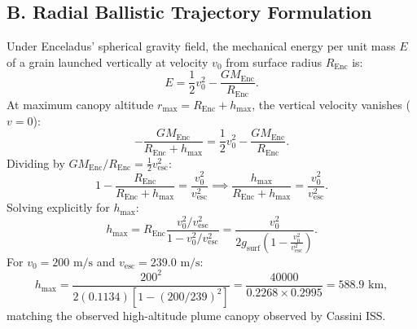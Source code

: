 \documentclass[11pt,a4paper]{article}
\begin{document}
\subsection*{B. Radial Ballistic Trajectory Formulation}
Under Enceladus' spherical gravity field, the mechanical energy per unit mass $E$ of a grain launched vertically at velocity $v_0$ from surface radius $R_{\mathrm{Enc}}$ is:
\begin{equation}
E = \frac{1}{2} v_0^2 - \frac{G M_{\mathrm{Enc}}}{R_{\mathrm{Enc}}}.
\end{equation}
At maximum canopy altitude $r_{\mathrm{max}} = R_{\mathrm{Enc}} + h_{\mathrm{max}}$, the vertical velocity vanishes ($v = 0$):
\begin{equation}
-\frac{G M_{\mathrm{Enc}}}{R_{\mathrm{Enc}} + h_{\mathrm{max}}} = \frac{1}{2} v_0^2 - \frac{G M_{\mathrm{Enc}}}{R_{\mathrm{Enc}}}.
\end{equation}
Dividing by $G M_{\mathrm{Enc}} / R_{\mathrm{Enc}} = \frac{1}{2} v_{\mathrm{esc}}^2$:
\begin{equation}
1 - \frac{R_{\mathrm{Enc}}}{R_{\mathrm{Enc}} + h_{\mathrm{max}}} = \frac{v_0^2}{v_{\mathrm{esc}}^2} \implies \frac{h_{\mathrm{max}}}{R_{\mathrm{Enc}} + h_{\mathrm{max}}} = \frac{v_0^2}{v_{\mathrm{esc}}^2}.
\end{equation}
Solving explicitly for $h_{\mathrm{max}}$:
\begin{equation}
h_{\mathrm{max}} = R_{\mathrm{Enc}} \frac{v_0^2 / v_{\mathrm{esc}}^2}{1 - v_0^2 / v_{\mathrm{esc}}^2} = \frac{v_0^2}{2 g_{\mathrm{surf}} \left( 1 - \frac{v_0^2}{v_{\mathrm{esc}}^2} \right)}.
\end{equation}
For $v_0 = 200\text{ m/s}$ and $v_{\mathrm{esc}} = 239.0\text{ m/s}$:
\begin{equation}
h_{\mathrm{max}} = \frac{200^2}{2(0.1134) [1 - (200/239)^2]} = \frac{40000}{0.2268 \times 0.2995} = 588.9\text{ km},
\end{equation}
matching the observed high-altitude plume canopy observed by Cassini ISS.
\end{document}
